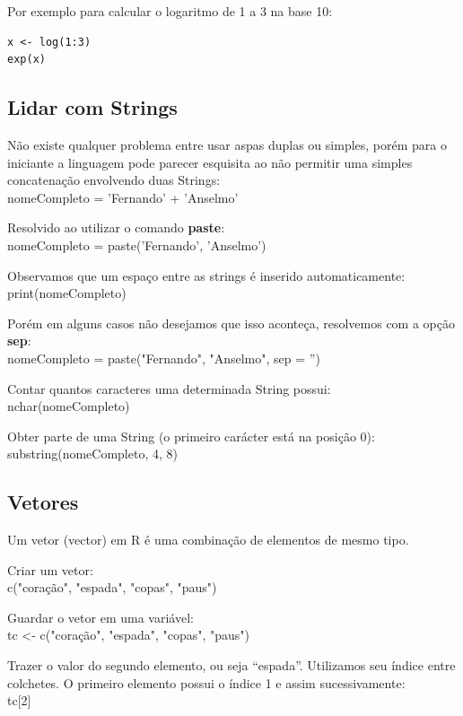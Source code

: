 \documentclass[a4paper,11pt]{article}
\begin{document}
Por exemplo para calcular o logaritmo de 1 a 3 na base 10:
\begin{lstlisting}
x <- log(1:3)
exp(x)
\end{lstlisting}

\subsection{Lidar com Strings}
Não existe qualquer problema entre usar aspas duplas ou simples, porém para o iniciante a linguagem pode parecer esquisita ao não permitir uma simples concatenação envolvendo duas Strings: \\
{\ttfamily nomeCompleto = 'Fernando' + 'Anselmo'}

Resolvido ao utilizar o comando \textbf{paste}: \\
{\ttfamily nomeCompleto = paste('Fernando', 'Anselmo')}

Observamos que um espaço entre as strings é inserido automaticamente: \\
{\ttfamily print(nomeCompleto)}

Porém em alguns casos não desejamos que isso aconteça, resolvemos com a opção \textbf{sep}: \\
{\ttfamily nomeCompleto = paste("Fernando", "Anselmo", sep = '')}

Contar quantos caracteres uma determinada String possui: \\
{\ttfamily nchar(nomeCompleto)}

Obter parte de uma String (o primeiro carácter está na posição 0): \\
{\ttfamily substring(nomeCompleto, 4, 8)}

\subsection{Vetores}
Um vetor (vector) em R é uma combinação de elementos de mesmo tipo.

Criar um vetor: \\
{\ttfamily c("coração", "espada", "copas", "paus")}

Guardar o vetor em uma variável: \\
{\ttfamily tc <- c("coração", "espada", "copas", "paus")}

Trazer o valor do segundo elemento, ou seja ``espada''. Utilizamos seu índice entre colchetes. O primeiro elemento possui o índice 1 e assim sucessivamente: \\
{\ttfamily tc[2]}
\end{document}
